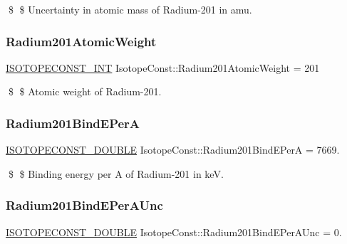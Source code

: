 \$ \$ Uncertainty in atomic mass of Radium-\/201 in amu. \mbox{\label{group___isotope_const-_radium-_ra201_gad2c6aa7f80af8766b5d13ec021b444d7}} 
\subsubsection{\texorpdfstring{Radium201\+Atomic\+Weight}{Radium201AtomicWeight}}
{\footnotesize\ttfamily \mbox{\hyperlink{group___isotope_const-_macros_ga5f18360b3e99483a35c32d789e62621c}{I\+S\+O\+T\+O\+P\+E\+C\+O\+N\+S\+T\+\_\+\+I\+NT}} Isotope\+Const\+::\+Radium201\+Atomic\+Weight = 201}

\$ \$ Atomic weight of Radium-\/201. \mbox{\label{group___isotope_const-_radium-_ra201_gae740962cba10bdea8d09f44272291a98}} 
\subsubsection{\texorpdfstring{Radium201\+Bind\+E\+PerA}{Radium201BindEPerA}}
{\footnotesize\ttfamily \mbox{\hyperlink{group___isotope_const-_macros_ga8f45a7272ce02c0b4c65c44636ed719a}{I\+S\+O\+T\+O\+P\+E\+C\+O\+N\+S\+T\+\_\+\+D\+O\+U\+B\+LE}} Isotope\+Const\+::\+Radium201\+Bind\+E\+PerA = 7669.}

\$ \$ Binding energy per A of Radium-\/201 in keV. \mbox{\label{group___isotope_const-_radium-_ra201_gaa7e7e4e9702e01d3497fac1218be2d7e}} 
\subsubsection{\texorpdfstring{Radium201\+Bind\+E\+Per\+A\+Unc}{Radium201BindEPerAUnc}}
{\footnotesize\ttfamily \mbox{\hyperlink{group___isotope_const-_macros_ga8f45a7272ce02c0b4c65c44636ed719a}{I\+S\+O\+T\+O\+P\+E\+C\+O\+N\+S\+T\+\_\+\+D\+O\+U\+B\+LE}} Isotope\+Const\+::\+Radium201\+Bind\+E\+Per\+A\+Unc = 0.}

